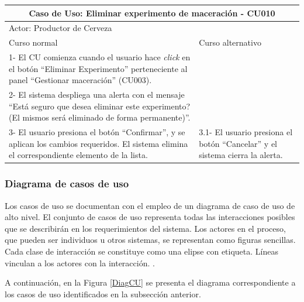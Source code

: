 \begin{longtable}{|p{7cm}|p{7cm}|}
        \hline
        \multicolumn{2}{|c|}{\textbf{Caso de Uso: Eliminar experimento de maceración - CU010}} \\
        \hline
        \multicolumn{2}{|l|}{Actor: Productor de Cerveza} \\
        \hline
        Curso normal & Curso alternativo \\
        \hline
        1- El CU comienza cuando el usuario hace \textit{click} en el botón ``Eliminar Experimento'' perteneciente al panel ``Gestionar maceración'' (CU003). & \\
        \hline
        2- El sistema despliega una alerta con el mensaje ``Está seguro que desea eliminar este experimento? (El mismos será eliminado de forma permanente)''. &
        \\
        \hline
        3- El usuario presiona el botón ``Confirmar'', y se aplican los cambios requeridos. El sistema elimina el correspondiente elemento de la lista. & 3.1- El usuario presiona el botón ``Cancelar'' y el sistema cierra la alerta.
        \\
        \hline

 \end{longtable}
    
      \subsubsection{Diagrama de casos de uso}
      \par
      Los casos de uso se documentan con el empleo de un diagrama de caso de uso de alto nivel. El conjunto de casos de uso representa todas las interacciones posibles que se describirán en los requerimientos del sistema. Los actores en el proceso, que pueden ser individuos u otros sistemas, se representan como figuras sencillas. Cada clase de interacción se constituye como una elipse con etiqueta. Líneas vinculan a los actores con la interacción. \cite{Som05}.
      \par
      A continuación, en la Figura \ref{DiagCU} se presenta el diagrama correspondiente a los casos de uso identificados en la subsección anterior.\\
      
